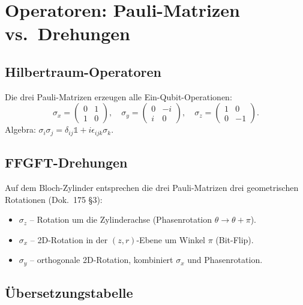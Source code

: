 \section{Operatoren: Pauli-Matrizen vs.\ Drehungen}

\subsection{Hilbertraum-Operatoren}

Die drei Pauli-Matrizen erzeugen alle Ein-Qubit-Operationen:
\begin{equation}
  \sigma_x = \begin{pmatrix}0 & 1 \\ 1 & 0\end{pmatrix},
  \quad
  \sigma_y = \begin{pmatrix}0 & -i \\ i & 0\end{pmatrix},
  \quad
  \sigma_z = \begin{pmatrix}1 & 0 \\ 0 & -1\end{pmatrix}.
\end{equation}
Algebra: $\sigma_i \sigma_j = \delta_{ij} \mathbb{1} + i\epsilon_{ijk}\sigma_k$.

\subsection{FFGFT-Drehungen}

Auf dem Bloch-Zylinder entsprechen die drei Pauli-Matrizen drei
geometrischen Rotationen (Dok.~175 §3):
\begin{itemize}[leftmargin=2em,itemsep=2pt,topsep=2pt]
  \item $\sigma_z$ -- Rotation um die Zylinderachse (Phasenrotation $\theta \to \theta + \pi$).
  \item $\sigma_x$ -- 2D-Rotation in der $(z, r)$-Ebene um Winkel $\pi$ (Bit-Flip).
  \item $\sigma_y$ -- orthogonale 2D-Rotation, kombiniert $\sigma_x$ und Phasenrotation.
\end{itemize}

\subsection{Übersetzungstabelle}

